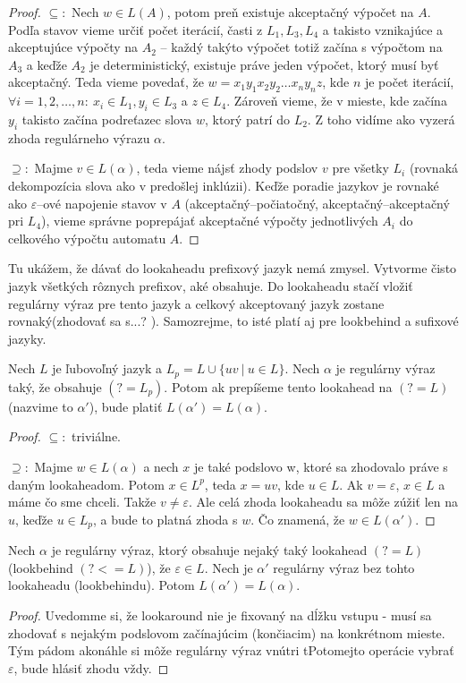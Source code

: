 \begin{proof}
$\subseteq:$ Nech $w \in L(A)$, potom preň existuje akceptačný výpočet na $A$. Podľa stavov vieme určiť počet iterácií, časti z $L_1,L_3,L_4$ a takisto vznikajúce a akceptujúce výpočty na $A_2$ -- každý takýto výpočet totiž začína s výpočtom na $A_3$ a keďže $A_2$ je deterministický, existuje práve jeden výpočet, ktorý musí byť akceptačný. Teda vieme povedať, že $w = x_1y_1x_2y_2 \dots x_ny_nz$, kde $n$ je počet iterácií, $\forall i = 1, 2, \dots, n : ~ x_i \in L_1, y_i \in L_3 $ a $z \in L_4$. Zároveň vieme, že v mieste, kde začína $y_i$ takisto začína podreťazec slova $w$, ktorý patrí do $L_2$. Z toho vidíme ako vyzerá zhoda regulárneho výrazu $\alpha$.

$\supseteq:$ Majme $v \in L(\alpha)$, teda vieme nájsť zhody podslov $v$ pre všetky $L_i$ (rovnaká dekompozícia slova ako v predošlej inklúzii). Keďže poradie jazykov je rovnaké ako $\varepsilon$--ové napojenie stavov v $A$ (akceptačný--počiatočný, akceptačný--akceptačný pri $L_4$), vieme správne poprepájať akceptačné výpočty jednotlivých $A_i$ do celkového výpočtu automatu $A$.
\end{proof}

Tu ukážem, že dávať do lookaheadu prefixový jazyk nemá zmysel. Vytvorme čisto jazyk všetkých rôznych prefixov, aké obsahuje. Do lookaheadu stačí vložiť regulárny výraz pre tento jazyk a celkový akceptovaný jazyk zostane rovnaký(zhodovať sa s...? \todo). Samozrejme, to isté platí aj pre lookbehind a sufixové jazyky.

\begin{veta}
Nech $L$ je ľubovoľný jazyk a $L_p = L \cup \lbrace uv ~|~ u \in L \rbrace$. Nech $\alpha$ je regulárny výraz taký, že obsahuje $(?=L_p)$. Potom ak prepíšeme tento lookahead na $(?=L)$ (nazvime to $\alpha '$), bude platiť $L(\alpha ') = L(\alpha )$.
\end{veta}
\begin{proof}
$\subseteq :$ triviálne.

$\supseteq :$ Majme $w \in L(\alpha)$ a nech $x$ je také podslovo w, ktoré sa zhodovalo práve s daným lookaheadom. Potom $x \in L^p$, teda $x=uv$, kde $u \in L$. Ak $v=\varepsilon$, $x \in L$ a máme čo sme chceli. Takže $v\neq \varepsilon$. Ale celá zhoda lookaheadu sa môže zúžiť len na $u$, keďže $u \in L_p$, a bude to platná zhoda s $w$. Čo znamená, že $w \in L(\alpha ')$.
\end{proof}

\begin{veta}
Nech $\alpha$ je regulárny výraz, ktorý obsahuje nejaký taký lookahead $(?=L)$ (lookbehind $(?<=L)$), že $\varepsilon \in L$. Nech je $\alpha '$ regulárny výraz bez tohto lookaheadu (lookbehindu). Potom $L(\alpha ') = L(\alpha)$.
\end{veta}
\begin{proof}
Uvedomme si, že lookaround nie je fixovaný na dĺžku vstupu - musí sa zhodovať s nejakým podslovom začínajúcim (končiacim) na konkrétnom mieste. Tým pádom akonáhle si môže regulárny výraz vnútri tPotomejto operácie vybrať $\varepsilon$, bude hlásiť zhodu vždy.
\end{proof}

